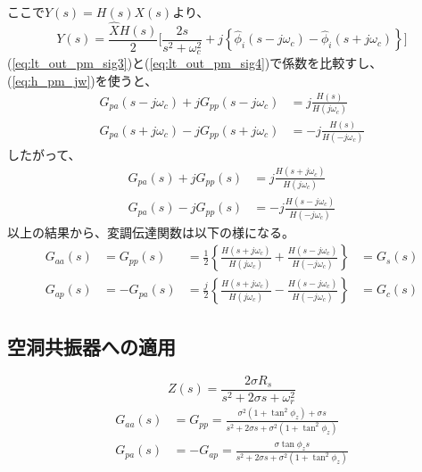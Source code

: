 \documentclass[book]{jlreq}
\begin{document}
%
ここで$Y(s) = H(s) X(s)$より、
%
\begin{equation}
    Y(s) = \frac{\hat{X}H(s)}{2} \biggl [\frac{2 s}{s^2+\omega_c^2}
        + j \left \{\hat{\phi}_i(s - j\omega_c) - \hat{\phi}_i(s+j\omega_c)\right \}  \biggr ]
    \label{eq:lt_out_pm_sig4}
\end{equation}
%
(\ref{eq:lt_out_pm_sig3})と(\ref{eq:lt_out_pm_sig4})で係数を比較すし、(\ref{eq:h_pm_jw})を使うと、
%
\begin{equation}
    \begin{split}
        G_{pa}(s-j\omega_c) + j G_{pp}(s-j\omega_c) &= j \frac{H(s)}{H(j\omega_c)} \\
        G_{pa}(s+j\omega_c) - j G_{pp}(s+j\omega_c) &= -j \frac{H(s)}{H(-j\omega_c)}
    \end{split}
\end{equation}
%
したがって、
%
\begin{equation}
    \begin{split}
        G_{pa}(s) + j G_{pp}(s) &= j \frac{H(s+j\omega_c)}{H(j\omega_c)} \\
        G_{pa}(s) - j G_{pp}(s) &= -j \frac{H(s-j\omega_c)}{H(-j\omega_c)}
    \end{split}
\end{equation}
%
以上の結果から、変調伝達関数は以下の様になる。
%
\begin{equation}
    \begin{aligned}
        G_{aa}(s) & = G_{pp}(s)
                  & = \frac{1}{2}\left\{\frac{H(s+j\omega_c)}{H(j\omega_c)} + \frac{H(s-j\omega_c)}{H(-j\omega_c)}\right\} & = G_s(s) \\
        G_{ap}(s) & = -G_{pa}(s)
                  & = \frac{j}{2}\left\{\frac{H(s+j\omega_c)}{H(j\omega_c)} - \frac{H(s-j\omega_c)}{H(-j\omega_c)}\right\} & = G_c(s)
    \end{aligned}
\end{equation}
%
\subsection{空洞共振器への適用}
%
\begin{equation}
    Z(s) = \frac{2\sigma R_s}{s^2+2\sigma s + \omega_r^2}
\end{equation}
%
\begin{align}
    G_{aa}(s) & = G_{pp} = \frac{\sigma^2(1+\tan^2\phi_z)+\sigma s}{s^2+2\sigma s + \sigma^2(1+\tan^2\phi_z)} \\
    G_{pa}(s) & = - G_{ap} = \frac{\sigma\tan\phi_z s}{s^2+2\sigma s + \sigma^2(1+\tan^2\phi_z)}
\end{align}
%
\end{document}
